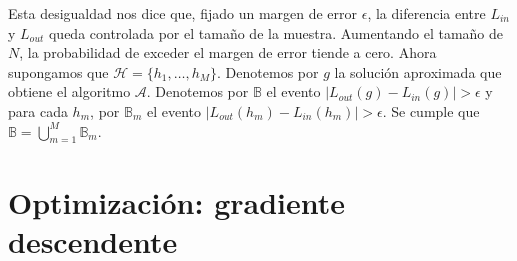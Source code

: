 Esta desigualdad nos dice que, fijado un margen de error $\epsilon$, la diferencia entre $L_{in}$ y $L_{out}$ queda controlada por el tamaño de la muestra. Aumentando el tamaño de $N$, la probabilidad de exceder el margen de error tiende a cero. 
Ahora supongamos que $\mathcal{H} = \{h_1, \ldots, h_M\}$. Denotemos por $g$ la solución aproximada que obtiene el algoritmo $\mathcal{A}$. Denotemos por $\mathbb{B}$ el evento $|L_{out}(g) - L_{in}(g)| > \epsilon$ y para cada $h_m$, por $\mathbb{B}_m$ el evento $|L_{out}(h_m) - L_{in}(h_m)| > \epsilon$. Se cumple que $  \mathbb{B} = \bigcup_{m=1}^{M} \mathbb{B}_m$.








\section{Optimización: gradiente descendente}